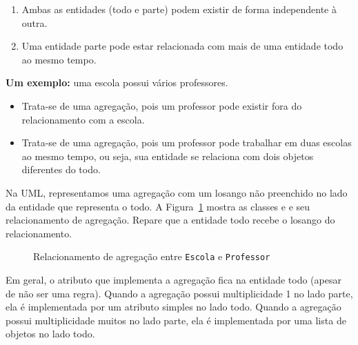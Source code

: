 \begin{enumerate}
	\item Ambas as entidades (todo e parte) podem existir de forma independente à outra.
	\item Uma entidade parte pode estar relacionada com mais de uma entidade todo ao mesmo tempo.
\end{enumerate}
 
\textbf{Um exemplo:} uma escola possui vários professores.
\begin{itemize}
	\item Trata-se de uma agregação, pois um professor pode existir fora do relacionamento com a escola.
	\item Trata-se de uma agregação, pois um professor pode trabalhar em duas escolas ao mesmo tempo, ou seja, sua entidade se relaciona com dois objetos diferentes do todo.
\end{itemize}

Na UML, representamos uma agregação com um losango não preenchido no lado da entidade que representa o todo. A Figura~\ref{fig:agregacao-professor-escola} mostra as classes  e  e seu relacionamento de agregação. Repare que a entidade todo recebe o losango do relacionamento.

\begin{figure}[h]
	\centering
	
	
	\caption{Relacionamento de agregação entre \texttt{Escola} e \texttt{Professor}}
	\label{fig:agregacao-professor-escola}
\end{figure}

Em geral, o atributo que implementa a agregação fica na entidade todo (apesar de não ser uma regra). Quando a agregação possui multiplicidade 1 no lado parte, ela é implementada por um atributo simples no lado todo. Quando a agregação possui multiplicidade muitos no lado parte, ela é implementada por uma lista de objetos no lado todo.

